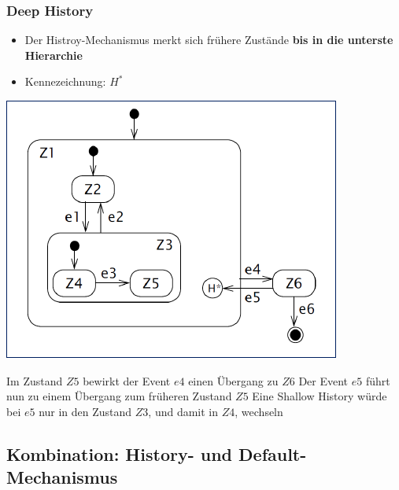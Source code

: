 \subsubsection{Deep History}

\begin{itemize}
    \item Der Histroy-Mechanismus merkt sich frühere Zustände \textbf{bis in die unterste Hierarchie}
    \item Kennezeichnung: $H^*$
\end{itemize}



\begin{minipage}[c]{0.48\columnwidth}
    \includegraphics[width=\columnwidth]{images/statechart_deep_history.pdf}
\end{minipage}
\hfill
\begin{minipage}[c]{0.48\columnwidth}
    \begin{outline}
        \1 Im Zustand $Z5$ bewirkt der Event $e4$ einen Übergang zu $Z6$
        \1 Der Event $e5$ führt nun zu einem Übergang zum früheren Zustand $Z5$
            \2 Eine Shallow History würde bei $e5$ nur in den Zustand $Z3$, und damit in $Z4$, wechseln
    \end{outline}
\end{minipage}


\subsection{Kombination: History- und Default-Mechanismus}


